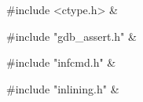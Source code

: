 \medskip
\begin{cxreftabi}
{\stt \#include <ctype.h>} &\\
\end{cxreftabi}

\medskip
\begin{cxreftabi}
{\stt \#include "gdb\_assert.h"} &\\
\end{cxreftabi}

\medskip
\begin{cxreftabi}
{\stt \#include "infcmd.h"} &\\
\end{cxreftabi}

\medskip
\begin{cxreftabi}
{\stt \#include "inlining.h"} &\\
\end{cxreftabi}

